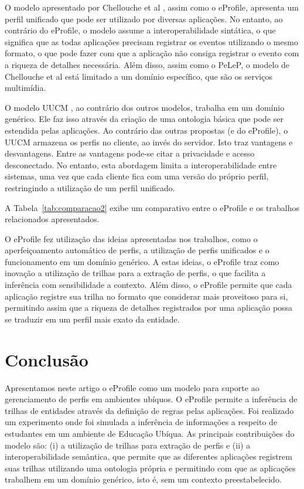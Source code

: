 \documentclass[times, 10pt, twocolumn]{article}
\begin{document}
O modelo apresentado por Chellouche et al \cite{chellouche10}, assim como o eProfile, apresenta um perfil unificado que pode ser utilizado por diversas aplicações. No entanto, ao contrário do eProfile, o modelo assume a interoperabilidade sintática, o que significa que as todas aplicações precisam registrar os eventos utilizando o mesmo formato, o que pode fazer com que a aplicação não consiga registrar o evento com a riqueza de detalhes necessária. Além disso, assim como o PeLeP, o modelo de Chellouche et al \cite{chellouche10} está limitado a um domínio específico, que são os serviços multimídia.

O modelo UUCM \cite{niederee04}, ao contrário dos outros modelos, trabalha em um domínio genérico. Ele faz isso através da criação de uma ontologia básica que pode ser estendida pelas aplicações. Ao contrário das outras propostas (e do eProfile), o UUCM armazena os perfis no cliente, ao invés do servidor. Isto traz vantagens e desvantagens. Entre as vantagens pode-se citar a privacidade e acesso desconectado. No entanto, esta abordagem limita a interoperabilidade entre sistemas, uma vez que cada cliente fica com uma versão do próprio perfil, restringindo a utilização de um perfil unificado.

A Tabela~\ref{tab:comparacao2} exibe um comparativo entre o eProfile e os trabalhos relacionados apresentados.

O eProfile fez utilização das ideias apresentadas nos trabalhos, como o aperfeiçoamento automático de perfis, a utilização de perfis unificados e o funcionamento em um domínio genérico. A estas ideias, o eProfile traz como inovação a utilização de trilhas para a extração de perfis, o que facilita a inferência com sensibilidade a contexto. Além disso, o eProfile permite que cada aplicação registre sua trilha no formato que considerar mais proveitoso para si, permitindo assim que a riqueza de detalhes registrados por uma aplicação possa se traduzir em um perfil mais exato da entidade.

\section{Conclusão}
\label{sec:conclusao}

Apresentamos neste artigo o eProfile como um modelo para suporte ao gerenciamento de perfis em ambientes ubíquos. O eProfile permite a inferência de trilhas de entidades através da definição de regras pelas aplicações. Foi realizado um experimento onde foi simulada a inferência de informações a respeito de estudantes em um ambiente de Educação Ubíqua. As principais contribuições do modelo são: (i) a utilização de trilhas para extração de perfis e (ii) a interoperabilidade semântica, que permite que as diferentes aplicações registrem suas trilhas utilizando uma ontologia própria e permitindo com que as aplicações trabalhem em um domínio genérico, isto é, sem um contexto preestabelecido.
\end{document}
